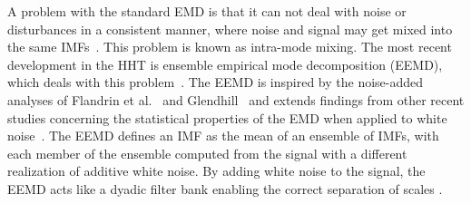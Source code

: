 \documentclass[a4paper]{IEEEtran}
\begin{document}
A problem with the standard EMD is that it can not deal with noise or disturbances in a consistent manner, where noise and signal may get mixed into the same IMFs~\cite{Wu2009}. This problem is known as intra-mode mixing. The most recent development in the HHT is ensemble empirical mode decomposition (EEMD), which deals with this problem~\cite{Wu2009}. The EEMD is inspired by the noise-added analyses of Flandrin et al.~\cite{Flandrin2005} and Glendhill~\cite{Gledhill2003} and extends findings from other recent studies concerning the statistical properties of the EMD when applied to white noise~\cite{Flandrin2004,Wu2004}. The EEMD defines an IMF as the mean of an ensemble of IMFs, with each member of the ensemble computed from the signal with a different realization of additive white noise. By adding white noise to the signal, the EEMD acts like a dyadic filter bank enabling the correct separation of scales \cite{Flandrin2005a}.
\end{document}
